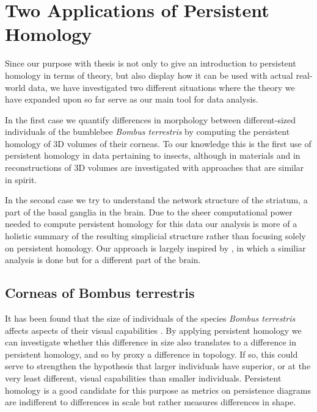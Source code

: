 \chapter{Two Applications of Persistent Homology}
Since our purpose with thesis is not only to give an introduction to persistent homology in terms of theory, but also display how it can be used with actual real-world data, we have investigated two different situations where the theory we have expanded upon so far serve as our main tool for data analysis.

In the first case we quantify differences in morphology between different-sized individuals of the bumblebee \textit{Bombus terrestris} by computing the persistent homology of 3D volumes of their corneas. To our knowledge this is the first use of persistent homology in data pertaining to insects, although in \cite{moon2019, delgadofriedrichs2014} materials and in \cite{gutierrez2012, gutierrez2014} reconstructions of 3D volumes are investigated with approaches that are similar in spirit.

In the second case we try to understand the network structure of the striatum, a part of the basal ganglia in the brain. Due to the sheer computational power needed to compute persistent homology for this data our analysis is more of a holistic summary of the resulting simplicial structure rather than focusing solely on persistent homology. Our approach is largely inspired by \cite{reimann}, in which a similiar analysis is done but for a different part of the brain.

\section{Corneas of Bombus terrestris}
It has been found that the size of individuals of the species \textit{Bombus terrestris} affects aspects of their visual capabilities \cite{emily}. By applying persistent homology we can investigate whether this difference in size also translates to a difference in persistent homology, and so by proxy a difference in topology. If so, this could serve to strengthen the hypothesis that larger individuals have superior, or at the very least different, visual capabilities than smaller individuals. Persistent homology is a good candidate for this purpose as metrics on persistence diagrams are indifferent to differences in scale but rather measures differences in shape.
